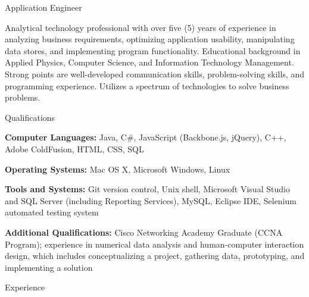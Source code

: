 



\begin{Large}\textsf{Application Engineer}\end{Large} \vspace{-2mm}

\begin{itemize1}
	\item Analytical technology professional with over five (5) years of experience in analyzing business requirements, optimizing application usability, manipulating data stores, and implementing program functionality.  Educational background in Applied Physics, Computer Science, and Information Technology Management. Strong points are well-developed communication skills, problem-solving skills, and programming experience. Utilizes a spectrum of technologies to solve business problems.
\end{itemize1}

\begin{Large}\textsf{Qualifications}\end{Large} \vspace{-2mm}

\begin{itemize1}
	\item \textbf{Computer Languages:} Java, C\#, JavaScript (Backbone.js, jQuery), C++, Adobe ColdFusion, HTML, CSS, SQL \vspace{2mm}
	\item \textbf{Operating Systems:} Mac OS X, Microsoft Windows, Linux \vspace{2mm}
	\item \textbf{Tools and Systems:} Git version control, Unix shell, Microsoft Visual Studio and SQL Server (including Reporting Services), MySQL, Eclipse IDE, Selenium automated testing system \vspace{2mm}
	\item \textbf{Additional Qualifications:} Cisco Networking Academy Graduate (CCNA Program); experience in numerical data analysis and human-computer interaction design, which includes conceptualizing a project, gathering data, prototyping, and implementing a solution
\end{itemize1}

\begin{Large}\textsf{Experience}\end{Large} \vspace{-2mm}

